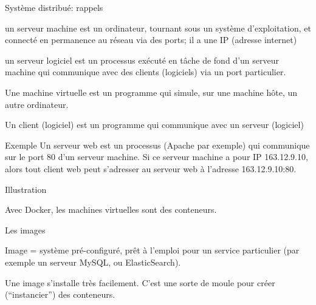 \begin{frame}{Système distribué: rappels}

\begin{redbullet}
  \item  un \alert{serveur machine} est un ordinateur, tournant sous un système d'exploitation,
    et connecté en permanence au réseau via des ports; il a une IP (adresse internet)
  \item   un \alert{serveur logiciel} est un processus exécuté en tâche de fond d'un serveur machine qui
    communique avec des \alert{clients (logiciels)} via un port particulier.
  \item Une \alert{machine virtuelle} est un programme qui simule, sur une machine hôte,
     un autre ordinateur.
   \item Un \alert{client} (logiciel) est un programme qui communique avec un serveur (logiciel)
\end{redbullet}
    
\begin{defblock}{Exemple}
Un serveur web est un processus (Apache par exemple) qui communique sur le
port 80 d'un serveur machine. Si ce serveur machine a pour IP 163.12.9.10, alors tout
client web peut s'adresser au serveur web à l'adresse 163.12.9.10:80.
\end{defblock}

\end{frame}


\begin{frame}{Illustration}

Avec Docker, les machines virtuelles sont des \alert{conteneurs}.

\vfill


\end{frame}


\begin{frame}{Les images}

Image = système pré-configuré, prêt à l'emploi pour un service particulier (par exemple un serveur
MySQL, ou ElasticSearch).

\vfill


\vfill
Une image s'installe très facilement. C'est une sorte de moule pour créer
(``instancier'')  des conteneurs.

\end{frame}


